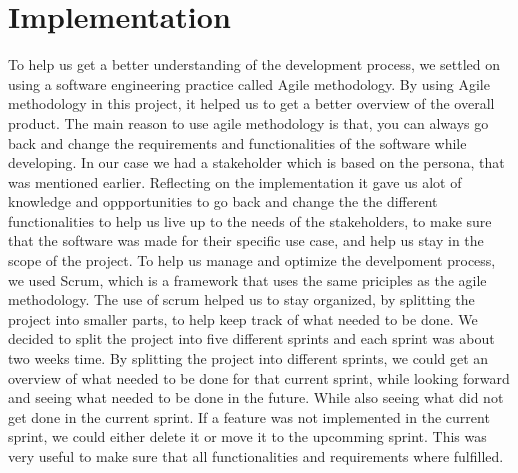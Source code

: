\section{Implementation}
To help us get a better understanding of the development process, we settled on using a software engineering practice called Agile methodology. By using Agile methodology in this project, it helped us to get a better overview of the overall product. The main reason to use agile methodology is that, you can always go back and change the requirements and functionalities of the software while developing.
In our case we had a stakeholder which is based on the persona, that was mentioned earlier. \newline
Reflecting on the implementation it gave us alot of knowledge and oppportunities to go back and change the the different functionalities to help us live up to the needs of the stakeholders, to make sure that the software was made for their specific use case, and help us stay in the scope of the project. \newline
To help us manage and optimize the develpoment process, we used Scrum, which is a framework that uses the same priciples as the agile methodology. The use of scrum helped us to stay organized, by splitting the project into smaller parts, to help keep track of what needed to be done.
We decided to split the project into five different sprints and each sprint was about two weeks time. By splitting the project into different sprints, we could get an overview of what needed to be done for that current sprint, while looking forward and seeing what needed to be done in the future.
While also seeing what did not get done in the current sprint. If a feature was not implemented in the current sprint, we could either delete it or move it to the upcomming sprint. This was very useful to make sure that all functionalities and requirements where fulfilled.

